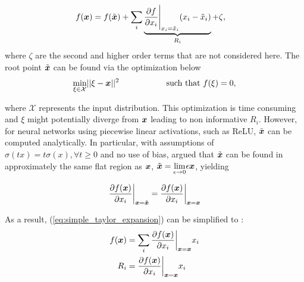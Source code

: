 
\begin{align} \label{eq:simple_taylor_expansion}
	f(\patvector{x}) 	&= f(\tilde{\patvector{x}}) + \sum_{i} \underbrace{\frac{\partial f }{ \partial x_i } \Bigg|_{x_i = \tilde{x}_i}  ( x_i - \tilde{x}_i ) }_{R_i} + \zeta, 
\end{align}
where $\zeta$ are the second and higher order terms that are not considered here. The root point $\tilde{\boldsymbol{x}}$ can be found via the optimization below 
\begin{align}
\underset{\xi \in \mathcal{X} }{\text{min}}  || \xi - \patvector{x} ||^2 \hspace{2cm}  \text{such that}\  f(\xi) = 0,
\end{align}

where $\mathcal{X}$ represents the input distribution. This optimization is time consuming  and $\xi$ might potentially diverge from $\patvector{x}$ leading to non informative $R_i$. However, for neural networks using piecewise linear activations, such as ReLU,  $\tilde{\boldsymbol{x}}$ can be computed analytically. In particular, with assumptions of $\sigma(tx) = t\sigma(x) ,\forall t \ge 0$ and no use of bias, \cite{MontavonMethodsInterpretingUnderstanding2017} argued that $\tilde{\patvector{x}}$ can be found in  approximately the same flat region as $\patvector{x}$, $\tilde{\patvector{x}} = \underset{\epsilon \rightarrow 0 }{\lim} \epsilon \patvector{x}$, yielding

\begin{align}
	\frac{\partial f(\patvector{x})}{\partial x_i}\bigg|_{\patvector{x}={\tilde{\patvector{x}}}} = \frac{\partial f(\patvector{x})}{\partial x_i}\bigg|_{\patvector{x}={\patvector{x}}} 
\end{align}

%
As a result, (\ref{eq:simple_taylor_expansion}) can be simplified to :
\begin{align}
	f(\patvector{x}) &= \sum_{i} \frac{\partial f(\patvector{x})}{\partial x_i}\bigg|_{\patvector{x}={\patvector{x}}}  x_i \\
	R_i &= \frac{\partial f(\patvector{x})}{\partial x_i}\bigg|_{\patvector{x}={\patvector{x}}}  x_i \label{eq:simple_r_i}
\end{align} 

